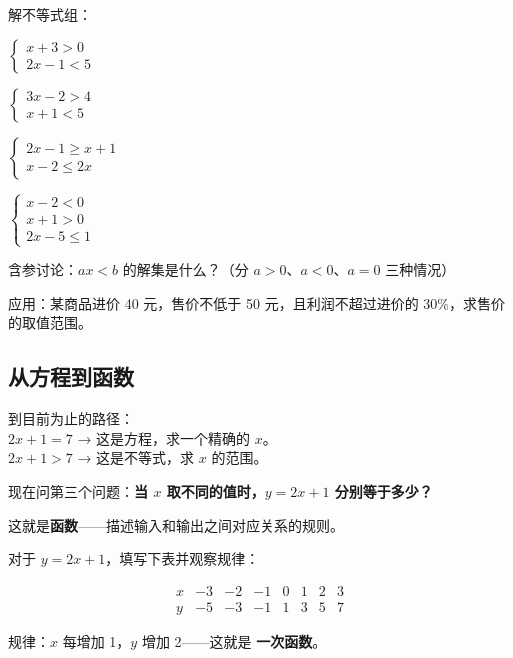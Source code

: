 \begin{exercise}
\item 解不等式组：
  \begin{subexercise}
    \item $\begin{cases}x+3>0\\2x-1<5\end{cases}$
    \item $\begin{cases}3x-2>4\\x+1<5\end{cases}$
    \item $\begin{cases}2x-1\ge x+1\\x-2\le 2x\end{cases}$
    \item $\begin{cases}x-2<0\\x+1>0\\2x-5\le1\end{cases}$
  \end{subexercise}

\item 含参讨论：$ax<b$ 的解集是什么？（分 $a>0$、$a<0$、$a=0$ 三种情况）

\item 应用：某商品进价 40 元，售价不低于 50 元，且利润不超过进价的 30\%，求售价的取值范围。
\end{exercise}


\subsection*{从方程到函数}

到目前为止的路径：\\
$2x+1=7$ → 这是方程，求一个精确的 $x$。\\
$2x+1>7$ → 这是不等式，求 $x$ 的范围。

现在问第三个问题：\textbf{当 $x$ 取不同的值时，$y=2x+1$ 分别等于多少？}

这就是\textbf{函数}——描述输入和输出之间对应关系的规则。

\begin{example}
对于 $y=2x+1$，填写下表并观察规律：
\end{example}
\begin{solution}
\[
\begin{array}{c|cccccc}
x & -3 & -2 & -1 & 0 & 1 & 2 & 3 \\ \hline
y & -5 & -3 & -1 & 1 & 3 & 5 & 7
\end{array}
\]

规律：$x$ 每增加 1，$y$ 增加 2——这就是 \textbf{一次函数}。
\end{solution}

